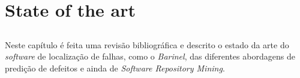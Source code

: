 \chapter{State of the art} \label{chap:sota}

\section*{}

Neste capítulo é feita uma revisão bibliográfica e descrito o estado da arte do \emph{software} de localização de falhas, como o \emph{Barinel}, das diferentes abordagens de predição de defeitos e ainda de \emph{Software Repository Mining}.





